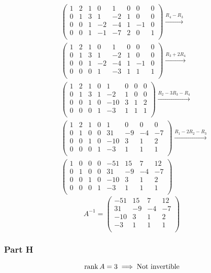 \documentclass[12pt,titlepage]{extarticle}
\begin{document}
\begin{align*}
    & \left(\begin{array}{cccccccc}1&2&1&0&1&0&0&0\\0&1&3&1&-2&1&0&0\\0&0&1&-2&-4&1&-1&0\\0&0&1&-1&-7&2&0&1\\\end{array}\right) \xrightarrow{R_4 - R_3} \\
    & \left(\begin{array}{cccccccc}1&2&1&0&1&0&0&0\\0&1&3&1&-2&1&0&0\\0&0&1&-2&-4&1&-1&0\\0&0&0&1&-3&1&1&1\\\end{array}\right) \xrightarrow{R_3 + 2 R_4} \\
    & \left(\begin{array}{cccccccc}1&2&1&0&1&0&0&0\\0&1&3&1&-2&1&0&0\\0&0&1&0&-10&3&1&2\\0&0&0&1&-3&1&1&1\\\end{array}\right) \xrightarrow{R_2 - 3 R_3 - R_4} \\
    & \left(\begin{array}{cccccccc}1&2&1&0&1&0&0&0\\0&1&0&0&31&-9&-4&-7\\0&0&1&0&-10&3&1&2\\0&0&0&1&-3&1&1&1\\\end{array}\right) \xrightarrow{R_1 - 2R_2 - R_3} \\
    & \left(\begin{array}{cccccccc}1&0&0&0&-51&15&7&12\\0&1&0&0&31&-9&-4&-7\\0&0&1&0&-10&3&1&2\\0&0&0&1&-3&1&1&1\\\end{array}\right)
\end{align*}
\[
    A^{-1} = \left(\begin{array}{cccc}-51&15&7&12\\31&-9&-4&-7\\-10&3&1&2\\-3&1&1&1\\\end{array}\right)
\]

\subsubsection*{Part H}
\[
    \rank A = 3 \implies \text{Not invertible}
\]
\end{document}
